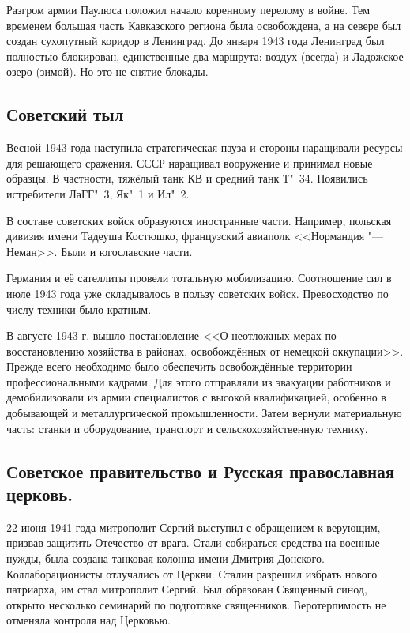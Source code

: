 Разгром армии Паулюса положил начало коренному перелому в войне. Тем временем большая часть Кавказского региона была освобождена, а на севере был создан сухопутный коридор в Ленинград. До января 1943 года Ленинград был полностью блокирован, единственные два маршрута: воздух (всегда) и Ладожское озеро (зимой). Но это не снятие блокады.

\subsection{Советский тыл}

Весной 1943 года наступила стратегическая пауза и стороны наращивали ресурсы для решающего сражения. СССР наращивал вооружение и принимал новые образцы. В частности, тяжёлый танк КВ и средний танк Т"~34. Появились истребители ЛаГГ"~3, Як"~1 и Ил"~2.

В составе советских войск образуются иностранные части. Например, польская дивизия имени Тадеуша Костюшко, французский авиаполк <<Нормандия "--- Неман>>. Были и югославские части.

Германия и её сателлиты провели тотальную мобилизацию. Соотношение сил в июле 1943 года уже складывалось в пользу советских войск. Превосходство по числу техники было кратным.

В августе 1943 г. вышло постановление <<О неотложных мерах по восстановлению хозяйства в районах, освобождённых от немецкой оккупации>>. Прежде всего необходимо было обеспечить освобождённые территории профессиональными кадрами. Для этого отправляли из эвакуации работников и демобилизовали из армии специалистов с высокой квалификацией, особенно в добывающей и металлургической промышленности. Затем вернули материальную часть: станки и оборудование, транспорт и сельскохозяйственную технику. 

\subsection{Советское правительство и Русская православная церковь.}

22 июня 1941 года митрополит Сергий выступил с обращением к верующим, призвав защитить Отечество от врага. Стали собираться средства на военные нужды, была создана танковая колонна имени Дмитрия Донского. Коллаборационисты отлучались от Церкви. Сталин разрешил избрать нового патриарха, им стал митрополит Сергий. Был образован Священный синод, открыто несколько семинарий по подготовке священников. Веротерпимость не отменяла контроля над Церковью.

